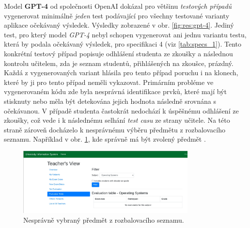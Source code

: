 \documentclass[czech, ma, kiv, he, iso690numb, pdf, viewonly]{fasthesis}
\begin{document}
            Model \textbf{GPT-4} od společnosti OpenAI dokázal pro většinu \textit{testových případů} vygenerovat minimálně \emph{jeden} test podávající pro všechny testované varianty aplikace očekávaný výsledek. Výsledky zobrazené v obr. \ref{fig:res:gpt-4}. Jediný test, pro který model \textit{GPT-4} nebyl schopen vygenerovat ani jednu variantu testu, která by podala očekávaný výsledek, pro specifikaci 4 (viz \ref{tab:specs_1}). Tento konkrétní testový případ popisuje odhlášení studenta ze zkoušky a následnou kontrolu učitelem, zda je seznam studentů, přihlášených na zkoušce, prázdný. Každá z vygenerovaných variant hlásila pro tento případ poruchu i na klonech, které by ji pro tento případ neměli vykazovat. Primárním probléme ve vygenerovaném kódu zde byla nesprávná identifikace prvků, které mají být stisknuty nebo měla být detekována jejich hodnota následně srovnána s očekávanou. V případě studenta častokrát nedochází k úspěšnému odhlášení ze zkoušky, což vede i k následnému selhání \textit{test casu} ze strany učitele. Na této straně zároveň docházelo k nesprávnému výběru předmětu z rozbalovacího seznamu. Například v obr. \ref{fig:wrong_subject_select}, kde správně má být zvolený předmět .

            \begin{figure}
                \includegraphics[width=0.8\textwidth]{pic/wrong_subject_select.png}
                \centering
                \caption{Nesprávně vybraný předmět z rozbalovacího seznamu.}
                \label{fig:wrong_subject_select}
            \end{figure}
\end{document}
